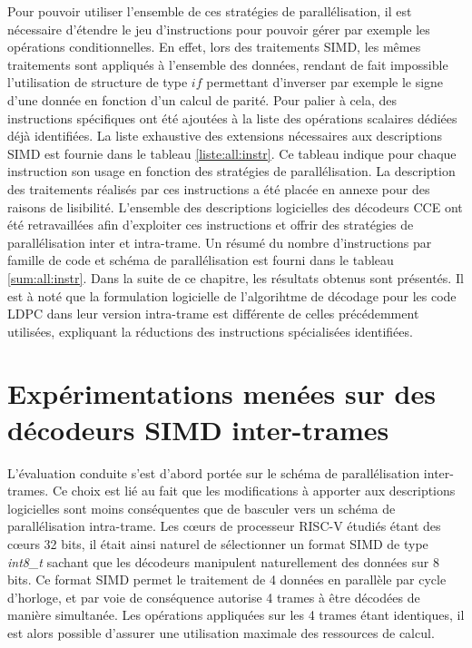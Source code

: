 \documentclass[../main.tex]{subfiles}
\begin{document}
Pour pouvoir utiliser l'ensemble de ces stratégies de parallélisation, il est nécessaire d'étendre le jeu d'instructions pour pouvoir gérer par exemple les opérations conditionnelles. 
En effet, lors des traitements SIMD, les mêmes traitements sont appliqués à l'ensemble des données, rendant de fait impossible l'utilisation de structure de type $if$ permettant d'inverser par exemple le signe d'une donnée en fonction d'un calcul de parité. 
Pour palier à cela, des instructions spécifiques ont été ajoutées à la liste des opérations scalaires dédiées déjà identifiées. 
La liste exhaustive des extensions nécessaires aux descriptions SIMD est fournie dans le tableau \ref{liste:all:instr}.
Ce tableau indique pour chaque instruction son usage en fonction des stratégies de parallélisation. 
La description des traitements réalisés par ces instructions a été placée en annexe pour des raisons de lisibilité. 
L'ensemble des descriptions logicielles des décodeurs CCE ont été retravaillées afin d'exploiter ces instructions et offrir des stratégies de parallélisation inter et intra-trame. 
Un résumé du nombre d'instructions par famille de code et schéma de parallélisation est fourni dans le tableau \ref{sum:all:instr}. 
Dans la suite de ce chapitre, les résultats obtenus sont présentés. Il est à noté que la formulation logicielle de l'algorihtme de décodage pour les code LDPC dans leur version intra-trame est différente de celles précédemment utilisées, expliquant la réductions des instructions spécialisées identifiées.

% 
% 
% 
% 
% 
\section{Expérimentations menées sur des décodeurs SIMD inter-trames}
% 
% 
% 
% 
% 

L'évaluation conduite s'est d'abord portée sur le schéma de parallélisation inter-trames. 
Ce choix est lié au fait que les modifications à apporter aux descriptions logicielles sont moins conséquentes que de basculer vers un schéma de parallélisation intra-trame.
Les cœurs de processeur RISC-V étudiés étant des cœurs 32 bits, il était ainsi naturel de sélectionner un format SIMD de type \textit{int8\_t } sachant que les décodeurs manipulent naturellement des données sur 8 bits. 
Ce format SIMD permet le traitement de 4 données en parallèle par cycle d'horloge, et par voie de conséquence autorise 4 trames à être décodées de manière simultanée. 
Les opérations appliquées sur les 4 trames étant identiques, il est alors possible d'assurer une utilisation maximale des ressources de calcul.
\end{document}

